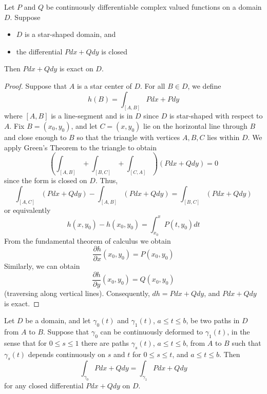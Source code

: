 \begin{theorem}
    Let $P$ and $Q$ be continuously differentiable complex valued functions on a domain $D$. Suppose \begin{itemize}
        \item $D$ is a star-shaped domain, and 
        \item the differential $Pdx+Qdy$ is closed
    \end{itemize}
    Then $Pdx+Qdy$ is exact on $D$.
\end{theorem}
\begin{proof}
    Suppose that $A$ is a star center of $D$. For all $B \in D$, we define \begin{equation*}
        h(B) = \int_{[A,B]}Pdx+Pdy
    \end{equation*}
    where $[A,B]$ is a line-segment and is in $D$ since $D$ is star-shaped with respect to $A$. Fix $B = (x_0, y_0)$, and let $C = (x,y_0)$ lie on the horizontal line through $B$ and close enough to $B$ so that the triangle with vertices $A, B, C$ lies within $D$. We apply Green's Theorem to the triangle to obtain \begin{equation*}
        \left(\int_{[A,B]} + \int_{[B,C]}+\int_{[C,A]}\right)(Pdx+Qdy) = 0
    \end{equation*}
    since the form is closed on $D$. Thus, \begin{equation*}
        \int_{[A,C]}(Pdx+Qdy)-\int_{[A,B]}(Pdx+Qdy) = \int_{[B,C]}(Pdx+Qdy)
    \end{equation*}
    or equivalently \begin{equation*}
        h(x,y_0) - h(x_0,y_0) = \int_{x_0}^xP(t,y_0)dt
    \end{equation*}
    From the fundamental theorem of calculus we obtain \begin{equation*}
        \frac{\partial h}{\partial x}(x_0,y_0) = P(x_0,y_0)
    \end{equation*}
    Similarly, we can obtain \begin{equation*}
        \frac{\partial h}{\partial y}(x_0,y_0) = Q(x_0,y_0)
    \end{equation*}
    (traversing along vertical lines). Consequently, $dh = Pdx+Qdy$, and $Pdx+Qdy$ is exact.
\end{proof}


\begin{theorem}
    Let $D$ be a domain, and let $\gamma_0(t)$ and $\gamma_1(t)$, $a \leq t \leq b$, be two paths in $D$ from $A$ to $B$. Suppose that $\gamma_0$ can be continuously deformed to $\gamma_1(t)$, in the sense that for $0 \leq s \leq 1$ there are paths $\gamma_s(t)$, $a \leq t \leq b$, from $A$ to $B$ such that $\gamma_s(t)$ depends continuously on $s$ and $t$ for $0 \leq s \leq t$, and $a \leq t \leq b$. Then \begin{equation*}
        \int_{\gamma_0}Pdx+Qdy = \int_{\gamma_1}Pdx+Qdy
    \end{equation*}
    for any closed differential $Pdx+Qdy$ on $D$.
\end{theorem}


